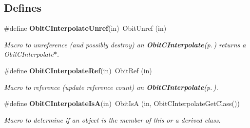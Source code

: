 \subsection*{Defines}
\begin{CompactItemize}
\item 
\#define {\bf Obit\-CInterpolate\-Unref}(in)\ Obit\-Unref (in)
\begin{CompactList}\small\item\em Macro to unreference (and possibly destroy) an {\bf Obit\-CInterpolate}{\rm (p.\,\pageref{structObitCInterpolate})} returns a Obit\-CInterpolate$\ast$. \item\end{CompactList}\item 
\#define {\bf Obit\-CInterpolate\-Ref}(in)\ Obit\-Ref (in)
\begin{CompactList}\small\item\em Macro to reference (update reference count) an {\bf Obit\-CInterpolate}{\rm (p.\,\pageref{structObitCInterpolate})}. \item\end{CompactList}\item 
\#define {\bf Obit\-CInterpolate\-Is\-A}(in)\ Obit\-Is\-A (in, Obit\-CInterpolate\-Get\-Class())
\begin{CompactList}\small\item\em Macro to determine if an object is the member of this or a derived class. \item\end{CompactList}\end{CompactItemize}
